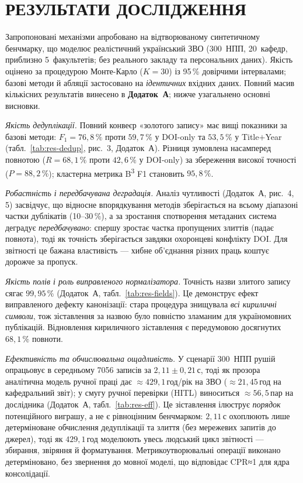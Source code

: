\section*{РЕЗУЛЬТАТИ ДОСЛІДЖЕННЯ}

Запропоновані механізми апробовано на відтворюваному синтетичному бенчмарку, що моделює реалістичний український ЗВО (300~НПП, 20~кафедр, приблизно 5~факультетів; без реального закладу та персональних даних). Якість оцінено за процедурою Монте-Карло ($K=30$) із 95\,\% довірчими інтервалами; базові методи й абляції застосовано на \textit{ідентичних} вхідних даних. Повний масив кількісних результатів винесено в \textbf{Додаток~А}; нижче узагальнено основні висновки.

\textit{Якість дедуплікації.} Повний конвеєр «золотого запису» має вищі показники за базові методи: $F_1 = 76{,}8\,\%$ проти $59{,}7\,\%$ у DOI-only та $53{,}5\,\%$ у Title$+$Year (табл.~\ref{tab:res-dedup}, рис.~3, Додаток~А). Різниця зумовлена насамперед повнотою ($R = 68{,}1\,\%$ проти $42{,}6\,\%$ у DOI-only) за збереження високої точності ($P = 88{,}2\,\%$); кластерна метрика B\textsuperscript{3} F1 становить $95{,}8\,\%$.

\textit{Робастність і передбачувана деградація.} Аналіз чутливості (Додаток~А, рис.~4, 5) засвідчує, що відносне впорядкування методів зберігається на всьому діапазоні частки дублікатів (10--30\,\%), а за зростання спотворення метаданих система деградує \textit{передбачувано}: спершу зростає частка пропущених злиттів (падає повнота), тоді як точність зберігається завдяки охоронцеві конфлікту DOI. Для звітності це бажана властивість --- хибне об'єднання різних праць коштує дорожче за пропуск.

\textit{Якість полів і роль виправленого нормалізатора.} Точність назви злитого запису сягає $99{,}95\,\%$ (Додаток~А, табл.~\ref{tab:res-fields}). Це демонструє ефект виправленого дефекту канонізації: стара процедура знищувала \textit{всі кириличні символи}, тож зіставлення за назвою було повністю зламаним для україномовних публікацій. Відновлення кириличного зіставлення є передумовою досягнутих $68{,}1\,\%$ повноти.

\textit{Ефективність та обчислювальна ощадливість.} У сценарії 300~НПП рушій опрацьовує в середньому 7056 записів за $2{,}11 \pm 0{,}21$\,с, тоді як прозора аналітична модель ручної праці дає $\approx 429{,}1$\,год/рік на ЗВО ($\approx 21{,}45$\,год на кафедральний звіт); у смугу ручної перевірки (HITL) виноситься $\approx 56{,}5$\,пар на дослідника (Додаток~А, табл.~\ref{tab:res-eff}). Це зіставлення ілюструє \textit{порядок} потенційного виграшу, а не є рівноцінним бенчмарком: $2{,}11$\,с охоплюють лише детерміноване обчислення дедуплікації та злиття (без мережевих запитів до джерел), тоді як $429{,}1$\,год моделюють увесь людський цикл звітності --- збирання, звіряння й форматування. Метрикоутворювальні операції виконано детерміновано, без звернення до мовної моделі, що відповідає CPR≈1 для ядра консолідації.

